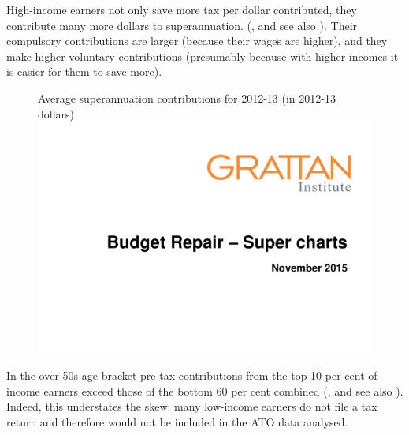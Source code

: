 High-income earners not only save more tax per dollar contributed, they contribute many more dollars to superannuation. (, and see also ). Their compulsory contributions are larger (because their wages are higher), and they make higher voluntary contributions (presumably because with higher incomes it is easier for them to save more). 

\begin{figure}
%
{Average superannuation contributions for 2012-13 (in 2012-13 dollars)}\label{fig:SUPER-4-3}
\includegraphics[width=\columnwidth,page=21]{super-atlas/PPTX.pdf}

\end{figure}

In the over-50s age bracket pre-tax contributions from the top 10 per cent of income earners exceed those of the bottom 60 per cent combined (, and see also ). Indeed, this understates the skew: many low-income earners do not file a tax return and therefore would not be included in the ATO data analysed.\enlargethispage{1\baselineskip}

